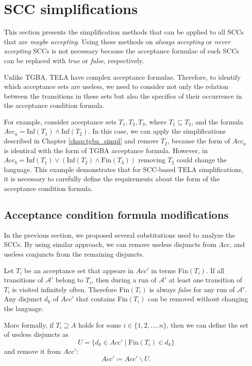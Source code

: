 \documentclass[
  digital, %
  twoside, %
  table,   %
  lof,     %
  lot,     %
]{fithesis3}
\begin{document}
\section{SCC simplifications}
This section presents the simplification methods that can be applied to all SCCs that are \emph{maybe accepting}. Using these methods on \emph{always accepting} or \emph{never accepting} SCCs is not necessary because the acceptance formulae of such SCCs can be replaced with \emph{true} or \emph{false}, respectively. 

Unlike TGBA, TELA have complex acceptance formulae. Therefore, to identify which acceptance sets are useless, we need to consider not only the relation between the transitions in these sets but also the specifics of their occurrence in the acceptance condition formula. 

For example, consider acceptance sets $T_1, T_2, T_3$, where $T_1 \subseteq T_2$, and the formula $Acc_a = \text{Inf}(T_1) \wedge \text{Inf}(T_2)$. In this case, we can apply the simplifications described in Chapter \ref{chap:tgba_simpl} and remove $T_2$, because the form of $Acc_a$ is identical with the form of TGBA acceptance formula. However, in $Acc_b = \text{Inf}(T_1) \vee (\text{Inf}(T_2) \wedge \text{Fin}(T_3))$ removing $T_2$ could change the language. This example demonstrates that for SCC-based TELA simplifications, it is necessary to carefully define the requirements about the form of the acceptance condition formula.

\subsection{Acceptance condition formula modifications}
In the previous section, we proposed several substitutions used to analyze the SCCs. By using similar approach, we can remove useless disjuncts from $Acc$, and useless conjuncts from the remaining disjuncts.

Let $T_i$ be an acceptance set that appears in $Acc'$ in terms Fin$(T_i)$. If all transitions of $\mathcal{A'}$ belong to $T_i$, then during a run of $\mathcal{A'}$ at least one transition of $T_i$ is visited infinitely often. Therefore Fin$(T_i)$ is always \emph{false} for any run of $\mathcal{A'}$. Any disjunct $d_k$ of $Acc'$ that contains Fin$(T_i)$ can be removed without changing the language.

More formally, if $T_i \supseteq A$ holds for some $i \in \{1,2, \dots, n\}$, then we can define the set of useless disjuncts as
\begin{equation*}
  U = \{d_k \in Acc' \mid \text{Fin}(T_i) \in d_k \}
\end{equation*}
and remove it from $Acc'$:
\begin{equation*}
  Acc' \coloneqq Acc' \smallsetminus U.
\end{equation*}
\end{document}
